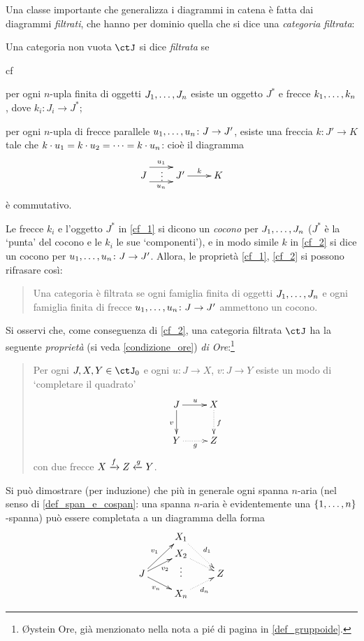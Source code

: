 Una classe importante che generalizza i diagrammi in catena è fatta dai diagrammi \emph{filtrati}, che hanno per dominio quella che si dice una \emph{categoria filtrata}:
\begin{definition}\label{def_cat_filtrata}
 Una categoria non vuota \(\ctJ\) si dice \emph{filtrata} se
 \begin{enumtag}{cf}
  \item \label{cf_1} per ogni \(n\)-upla finita di oggetti \({\tup Jn,}\) esiste un oggetto \(J^*\) e frecce \({\tup kn,}\), dove \(k_i \colon J_i\to J^*\);
  \item \label{cf_2} per ogni \(n\)-upla di frecce parallele \(\tup un, \colon J\to J'\), esiste una freccia \(k \colon J'\to K\) tale che \(k\cdot u_1 = k\cdot u_2 = \dots = k \cdot u_n\): cioè il diagramma
  \[\xymatrix{
   J \ar@<.75pc>[r]^-{u_1} \ar@{}@<.2pc>[r]|\vdots\ar@<-.5pc>[r]_-{u_n} & J' \ar[r]^-k & K
   }\]
  è commutativo.
 \end{enumtag}
 Le frecce \(k_i\) e l'oggetto \(J^*\) in \ref{cf_1} si dicono un \emph{cocono} per \({\tup Jn,}\) (\(J^*\) è la `punta' del cocono e le \(k_i\) le sue `componenti'), e in modo simile \(k\) in \ref{cf_2} si dice un cocono per \(\tup un, \colon J\to J'\). Allora, le proprietà \ref{cf_1}, \ref{cf_2} si possono rifrasare così:
 \begin{quote}
  Una categoria è filtrata se ogni famiglia finita di oggetti \({\tup Jn,}\) e ogni famiglia finita di frecce \(\tup un, \colon J\to J'\) ammettono un cocono.
 \end{quote}
 Si osservi che, come conseguenza di \ref{cf_2}, una categoria filtrata \(\ctJ\) ha la seguente \emph{proprietà} (si veda \ref{condizione_ore}) \emph{di Ore}:\footnote{Øystein Ore, già menzionato nella nota a pié di pagina in \ref{def_gruppoide}.}
 \begin{quote}
  Per ogni \(J,X,Y\in\ctJ_0\) e ogni \(u \colon J\to X\), \(v \colon J\to Y\) esiste un modo di `completare il quadrato'
  \[\xymatrix{
    J\ar[r]^u\ar[d]_v & X \ar@{.>}[d]^{f}\\
    Y \ar@{.>}[r]_{g} & Z
   }\]
  con due frecce \(X \xrightarrow{f}Z \xleftarrow{g} Y\).
 \end{quote}
\end{definition}
Si può dimostrare (per induzione) che più in generale ogni spanna \(n\)-aria (nel senso di \ref{def_span_e_cospan}: una spanna \(n\)-aria è evidentemente una \(\{\iter n\}\)-spanna) può essere completata a un diagramma della forma
\[\xymatrix@R=1mm{
 & X_1\ar@{.>}[ddr]^{d_1}\\
 & X_2\ar@{.>}[dr]\\
 J \ar[uur]^-{v_1}\ar[ur]_{v_2}\ar[dr]_-{v_n} & \vdots & Z\\
 & X_n\ar@{.>}[ur]_{d_n}
 }\]
